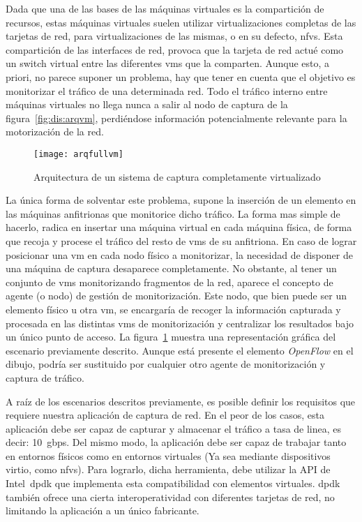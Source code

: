Dada que una de las bases de las máquinas virtuales es la compartición de recursos, estas máquinas virtuales suelen utilizar virtualizaciones completas de las tarjetas de red, para virtualizaciones de las mismas, o en su defecto, \glspl{nfv}. Esta compartición de las interfaces de red, provoca que la tarjeta de red actué como un switch virtual entre las diferentes \glspl{vm} que la comparten. Aunque esto, a priori, no parece suponer un problema, hay que tener en cuenta que el objetivo es monitorizar el tráfico de una determinada red. Todo el tráfico interno entre máquinas virtuales no llega nunca a salir al nodo de captura de la figura~\ref{fig:dis:arqvm}, perdiéndose información potencialmente relevante para la motorización de la red.


\begin{figure}[!th]
\centering
\texttt{[image: arqfullvm]}
\caption{Arquitectura de un sistema de captura completamente virtualizado}
\label{fig:dis:arqfullvm}
\end{figure}

La única forma de solventar este problema, supone la inserción de un elemento en las máquinas anfitrionas que monitorice dicho tráfico. La forma mas simple de hacerlo, radica en insertar una máquina virtual en cada máquina física, de forma que recoja y procese el tráfico del resto de \glspl{vm} de su anfitriona.
En caso de lograr posicionar una \gls{vm} en cada nodo físico a monitorizar, la necesidad de disponer de una máquina de captura desaparece completamente. No obstante, al tener un conjunto de \glspl{vm} monitorizando fragmentos de la red, aparece el concepto de agente (o nodo) de gestión de monitorización. Este nodo, que bien puede ser un elemento físico u otra \gls{vm}, se encargaría de recoger la información capturada y procesada en las distintas \glspl{vm} de monitorización y centralizar los resultados bajo un único punto de acceso. La figura~\ref{fig:dis:arqfullvm} muestra una representación gráfica del escenario previamente descrito. Aunque está presente el elemento \textit{OpenFlow} en el dibujo, podría ser sustituido por cualquier otro agente de monitorización y captura de tráfico.


A raíz de los escenarios descritos previamente, es posible definir los requisitos que requiere nuestra aplicación de captura de red.
En el peor de los casos, esta aplicación debe ser capaz de capturar y almacenar el tráfico a tasa de linea, es decir: 10~\gls{gbps}.
Del mismo modo, la aplicación debe ser capaz de trabajar tanto en entornos físicos como en entornos virtuales (Ya sea mediante dispositivos \gls{virtio}, como \glspl{nfv}).
Para lograrlo, dicha herramienta, debe utilizar la API de Intel~\gls{dpdk} que implementa esta compatibilidad con elementos virtuales. \gls{dpdk} también ofrece una cierta interoperatividad con diferentes tarjetas de red, no limitando la aplicación a un único fabricante.

